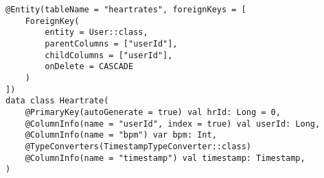 \begin{lstlisting}[caption={Heartrate Entity (Kotlin)}]
@Entity(tableName = "heartrates", foreignKeys = [
    ForeignKey(
        entity = User::class,
        parentColumns = ["userId"],
        childColumns = ["userId"],
        onDelete = CASCADE
    )
])
data class Heartrate(
    @PrimaryKey(autoGenerate = true) val hrId: Long = 0,
    @ColumnInfo(name = "userId", index = true) val userId: Long,
    @ColumnInfo(name = "bpm") var bpm: Int,
    @TypeConverters(TimestampTypeConverter::class)
    @ColumnInfo(name = "timestamp") val timestamp: Timestamp,
)
\end{lstlisting}
